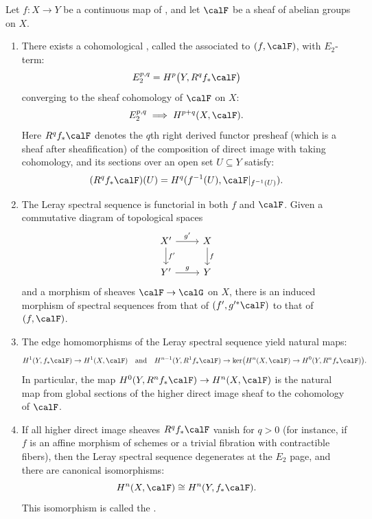 \begin{definition} \label{definition:leray_spectral_sequence}

Let $f: X \to Y$ be a continuous map of , and let $\calF$ be a sheaf of abelian groups on $X$.

\begin{enumerate}
    \item There exists a cohomological , called the  associated to $(f, \calF)$, with $E_2$-term:
    $$ E_2^{p,q} = H^p\bigl(Y, R^q f_* \calF\bigr) $$
    converging to the sheaf cohomology of $\calF$ on $X$:
    $$ E_2^{p,q} \implies H^{p+q}(X, \calF). $$
    Here $R^q f_* \calF$ denotes the $q$th right derived functor presheaf (which is a sheaf after sheafification) of the composition of direct image with taking cohomology, and its sections over an open set $U \subseteq Y$ satisfy:
    $$ (R^q f_* \calF)(U) = H^q(f^{-1}(U), \calF|_{f^{-1}(U)}). $$

    \item The Leray spectral sequence is functorial in both $f$ and $\calF$. Given a commutative diagram of topological spaces
    $$
    \begin{tikzcd}
    X' \arrow[r, "g'"] \arrow[d, "f'"] & X \arrow[d, "f"] \\
    Y' \arrow[r, "g"] & Y
    \end{tikzcd}
    $$
    and a morphism of sheaves $\calF \to \calG$ on $X$, there is an induced morphism of spectral sequences from that of $(f', g'^*\calF)$ to that of $(f, \calF)$.

    \item The edge homomorphisms of the Leray spectral sequence yield natural maps:
    $$ H^1(Y, f_* \calF) \to H^1(X, \calF) \quad \text{and} \quad H^{n-1}(Y, R^1 f_* \calF) \to \ker\bigl(H^n(X, \calF) \to H^0(Y, R^n f_* \calF)\bigr). $$
    In particular, the map $H^0(Y, R^n f_* \calF) \to H^n(X, \calF)$ is the natural map from global sections of the higher direct image sheaf to the cohomology of $\calF$.

    \item If all higher direct image sheaves $R^q f_* \calF$ vanish for $q > 0$ (for instance, if $f$ is an affine morphism of schemes or a trivial fibration with contractible fibers), then the Leray spectral sequence degenerates at the $E_2$ page, and there are canonical isomorphisms:
    $$ H^n(X, \calF) \cong H^n(Y, f_* \calF). $$
    This isomorphism is called the .


\end{enumerate}
\end{definition}
